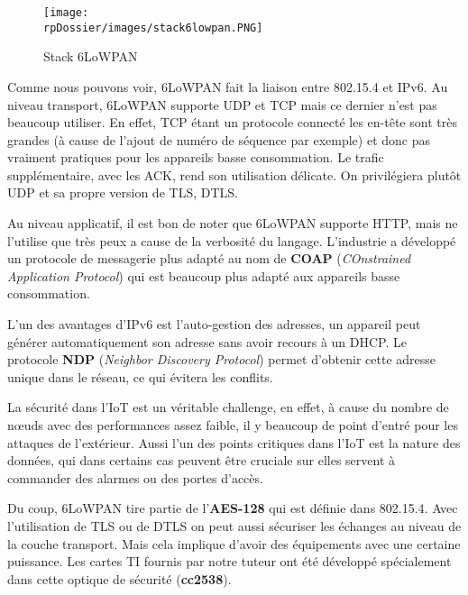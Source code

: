 \begin{figure}[H]
\centering
\texttt{[image: \\rpDossier/images/stack6lowpan.PNG]}
\caption{Stack 6LoWPAN}
\label{stack6lowpan}
\end{figure}

Comme nous pouvons voir, 6LoWPAN fait la liaison entre 802.15.4 et IPv6. Au niveau transport, 6LoWPAN supporte UDP et TCP mais ce dernier n'est pas beaucoup utiliser. En effet, TCP étant un protocole connecté les en-tête sont très grandes (à cause de l'ajout de numéro de séquence par exemple) et donc pas vraiment pratiques pour les appareils basse consommation. Le trafic supplémentaire, avec les ACK, rend son utilisation délicate. On privilégiera plutôt UDP et sa propre version de TLS, DTLS. 

Au niveau applicatif, il est bon de noter que 6LoWPAN supporte HTTP, mais ne l'utilise que très peux a cause de la verbosité du langage. L'industrie a développé un protocole de messagerie plus adapté au nom de \textbf{COAP} (\textit{COnstrained Application Protocol}) qui est beaucoup plus adapté aux appareils basse consommation.




L'un des avantages d'IPv6 est l'auto-gestion des adresses, un appareil peut générer automatiquement son adresse sans avoir recours à un DHCP. Le protocole \textbf{NDP} (\textit{Neighbor Discovery Protocol}) permet d'obtenir cette adresse unique dans le réseau, ce qui évitera les conflits.


La sécurité dans l'IoT est un véritable challenge, en effet, à cause du nombre de nœuds avec des performances assez faible, il y beaucoup de point d'entré pour les attaques de l'extérieur. Aussi l'un des points critiques dans l'IoT est la nature des données, qui dans certains cas peuvent être cruciale sur elles servent à commander des alarmes ou des portes d'accès.

Du coup, 6LoWPAN tire partie de l'\textbf{AES-128} qui est définie dans 802.15.4. Avec l'utilisation de TLS ou de DTLS on peut aussi sécuriser les échanges au niveau de la couche transport. Mais cela implique d'avoir des équipements avec une certaine puissance. Les cartes TI fournis par notre tuteur ont été développé spécialement dans cette optique de sécurité (\textbf{cc2538}).